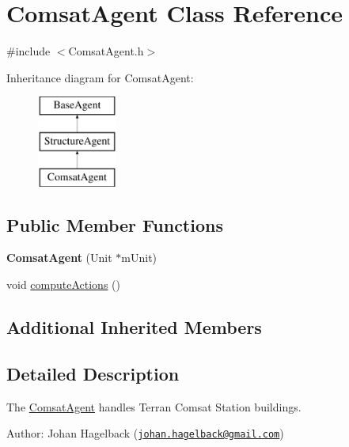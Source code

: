 \hypertarget{class_comsat_agent}{\section{Comsat\-Agent Class Reference}
\label{class_comsat_agent}
}


{\ttfamily \#include $<$Comsat\-Agent.\-h$>$}

Inheritance diagram for Comsat\-Agent\-:\begin{figure}[H]
\begin{center}
\leavevmode
\includegraphics[height=3.000000cm]{class_comsat_agent}
\end{center}
\end{figure}
\subsection*{Public Member Functions}
\begin{DoxyCompactItemize}
\item 
\hypertarget{class_comsat_agent_a2c9e4e5c425842f2b7a4cf4c6d2c52de}{{\bfseries Comsat\-Agent} (Unit $\ast$m\-Unit)}\label{class_comsat_agent_a2c9e4e5c425842f2b7a4cf4c6d2c52de}

\item 
void \hyperlink{class_comsat_agent_aa94033d23d7c19d68476d8eecf174f08}{compute\-Actions} ()
\end{DoxyCompactItemize}
\subsection*{Additional Inherited Members}


\subsection{Detailed Description}
The \hyperlink{class_comsat_agent}{Comsat\-Agent} handles Terran Comsat Station buildings.

Author\-: Johan Hagelback (\href{mailto:johan.hagelback@gmail.com}{\tt johan.\-hagelback@gmail.\-com}) 

